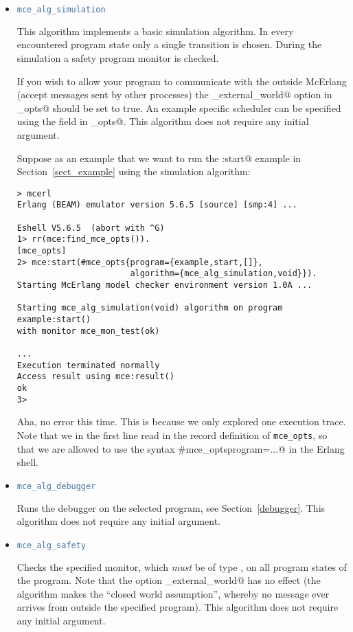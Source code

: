 \documentclass[a4paper]{article}
\begin{document}
\label{algorithms}
\begin{itemize}
\item
\begin{lstlisting}[language=Erlang]
mce_alg_simulation
\end{lstlisting}
This algorithm implements a basic simulation algorithm. In every
encountered program 
state only a single transition is chosen.
During the simulation a safety program monitor is checked.

If you wish to allow your program to communicate with the 
outside McErlang (accept messages sent by other processes)
the \lstinline@sim_external_world@ option in \lstinline@mce_opts@ 
should be set to true. An example specific scheduler can be specified
using the \lstinline@scheduler@ field in \lstinline@mce_opts@.
This algorithm does not require any initial argument.

Suppose as an example that we want to run the \lstinline@example:start@
example in Section~\ref{sect_example} using the simulation algorithm:
\begin{lstlisting}
> mcerl
Erlang (BEAM) emulator version 5.6.5 [source] [smp:4] ...

Eshell V5.6.5  (abort with ^G)
1> rr(mce:find_mce_opts()).   
[mce_opts]
2> mce:start(#mce_opts{program={example,start,[]},
                       algorithm={mce_alg_simulation,void}}).
Starting McErlang model checker environment version 1.0A ...

Starting mce_alg_simulation(void) algorithm on program
example:start()
with monitor mce_mon_test(ok)

...
Execution terminated normally
Access result using mce:result()
ok
3> 
\end{lstlisting}
Aha, no error this time. This is because we only explored one execution trace.
Note that we in the first line
read in the record definition of \lstinline{mce_opts}, so that we are allowed
to use the syntax \lstinline@#mce_opts{program=...}@ in the Erlang shell.

\item
\begin{lstlisting}[language=Erlang]
mce_alg_debugger
\end{lstlisting}
Runs the debugger on the selected program, see Section~\ref{debugger}.
This algorithm does not require any initial argument.

\item
\begin{lstlisting}[language=Erlang]
mce_alg_safety
\end{lstlisting}
Checks the specified monitor, which {\em must} be of type \lstinline@safety@,
on all program states of the program. 
Note that the option \lstinline@sim_external_world@
has no effect (the algorithm makes the ``closed world assumption'',
whereby no message ever arrives from outside the specified program).
This algorithm does not require any initial argument.


\end{itemize}
\end{document}
